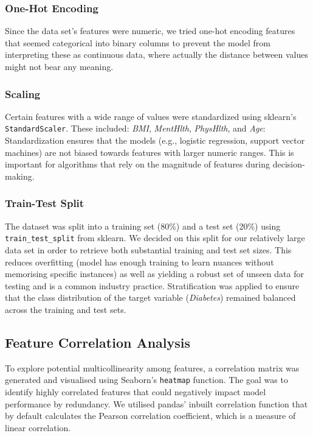 \documentclass[a4paper,12pt]{article}
\begin{document}
\subsubsection{One-Hot Encoding}
Since the data set's features were numeric, we tried one-hot encoding features that seemed categorical
into binary columns to prevent the model from interpreting these as continuous data, where actually
the distance between values might not bear any meaning. 


\subsubsection{Scaling}
Certain features with a wide range of values were standardized using sklearn's \texttt{StandardScaler}. These included:
\textit{BMI}, \textit{MentHlth}, \textit{PhysHlth}, and \textit{Age}: Standardization ensures that the models 
(e.g., logistic regression, support vector machines) are not biased towards features with larger 
numeric ranges. This is important for algorithms that rely on the magnitude of features during 
decision-making.

\subsubsection{Train-Test Split}
The dataset was split into a training set (80\%) and a test set (20\%) using \texttt{train\_test\_split} from 
sklearn. We decided on this split for our relatively large data set in order to retrieve both substantial 
training and test set sizes. This reduces overfitting (model has enough training to learn nuances without 
memorising specific instances) as well as yielding a robust set of unseen data for testing and is a common industry practice. 
Stratification was applied to ensure that the class distribution of the target variable 
(\textit{Diabetes}) remained balanced across the training and test sets.

\subsection{Feature Correlation Analysis}
To explore potential multicollinearity among features, a correlation matrix was generated and
visualised using Seaborn's \texttt{heatmap} function. The goal was to identify highly correlated features 
that could negatively impact model performance by redundancy. We utilised pandas' inbuilt correlation
function that by default calculates the Pearson correlation coefficient, which is a measure of linear correlation.
\end{document}
